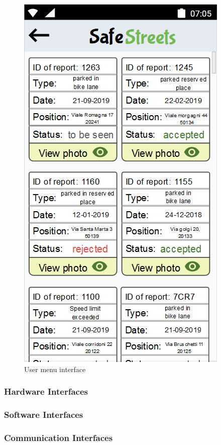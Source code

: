         \begin{figure}[h]
        \centering
        \includegraphics[scale=0.5]{Images/my_reports.png}
        \caption{User menu interface}
    \end{figure}
\subsubsection{Hardware Interfaces}

\subsubsection{Software Interfaces}

\subsubsection{Communication Interfaces}

